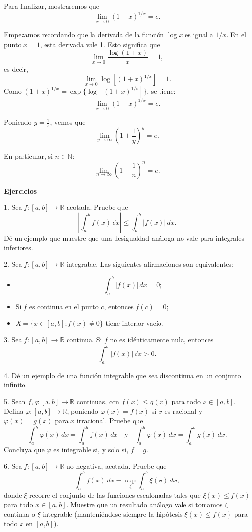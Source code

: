 \documentclass[12pt,oneside]{book}
\begin{document}
Para finalizar, mostraremos que
\[
\lim_{x \to 0} (1 + x)^{1/x} = e.
\]

Empezamos recordando que la derivada de la función \(\log x\) es igual a \(1/x\). En el punto \(x = 1\), esta derivada vale 1. Esto significa que
\[
\lim_{x \to 0} \frac{\log(1 + x)}{x} = 1,
\]
es decir,
\[
\lim_{x \to 0} \log[(1 + x)^{1/x}] = 1.
\]
Como \((1 + x)^{1/x} = \exp\{\log[(1 + x)^{1/x}]\}\), se tiene:
\[
\lim_{x \to 0} (1 + x)^{1/x} = e.
\]

Poniendo \(y = \frac{1}{x}\), vemos que
\[
\lim_{y \to \infty} \left(1 + \frac{1}{y}\right)^y = e.
\]

En particular, si \(n \in \mathbb{N}\):
\[
\lim_{n \to \infty} \left(1 + \frac{1}{n}\right)^n = e.
\]

\textbf{Ejercicios}

1. Sea \( f: [a, b] \to \mathbb{R} \) acotada. Pruebe que
\[
\left| \int_a^b f(x) \, dx \right| \leq \int_a^b |f(x)| \, dx.
\]
Dé un ejemplo que muestre que una desigualdad análoga no vale para integrales inferiores.

2. Sea \( f: [a, b] \to \mathbb{R} \) integrable. Las siguientes afirmaciones son equivalentes:
\begin{itemize}
    \item[1.]\[ \int_a^b |f(x)| \, dx = 0; \]

    \item[2.] Si \( f \) es continua en el punto \( c \), entonces \( f(c) = 0 \);

    \item[3.] \( X = \{x \in [a, b]; f(x) \neq 0\} \) tiene interior vacío.
\end{itemize}

3. Sea \( f: [a, b] \to \mathbb{R} \) continua. Si \( f \) no es idénticamente nula, entonces
\[
\int_a^b |f(x)| \, dx > 0.
\]

4. Dé un ejemplo de una función integrable que sea discontinua en un conjunto infinito.

5. Sean \( f, g: [a, b] \to \mathbb{R} \) continuas, con \( f(x) \leq g(x) \) para todo \( x \in [a, b] \). Defina \( \varphi: [a, b] \to \mathbb{R} \), poniendo \( \varphi(x) = f(x) \) si \( x \) es racional y \( \varphi(x) = g(x) \) para \( x \) irracional. Pruebe que
\[
\int_a^b \varphi(x) \, dx = \int_a^b f(x) \, dx \quad \text{y} \quad \int_a^b \varphi(x) \, dx = \int_a^b g(x) \, dx.
\]
Concluya que \( \varphi \) es integrable si, y solo si, \( f = g \).

6. Sea \( f: [a, b] \to \mathbb{R} \) no negativa, acotada. Pruebe que
\[
\int_a^b f(x) \, dx = \sup_{\xi} \int_a^b \xi(x) \, dx,
\]
donde \( \xi \) recorre el conjunto de las funciones escalonadas tales que \( \xi(x) \leq f(x) \) para todo \(x \in [a, b]\). Muestre que un resultado análogo vale si tomamos \(\xi\) continua o \(\xi\) integrable (manteniéndose siempre la hipótesis \(\xi(x) \leq f(x)\) para todo \(x\) en \([a, b]\)).
\end{document}
